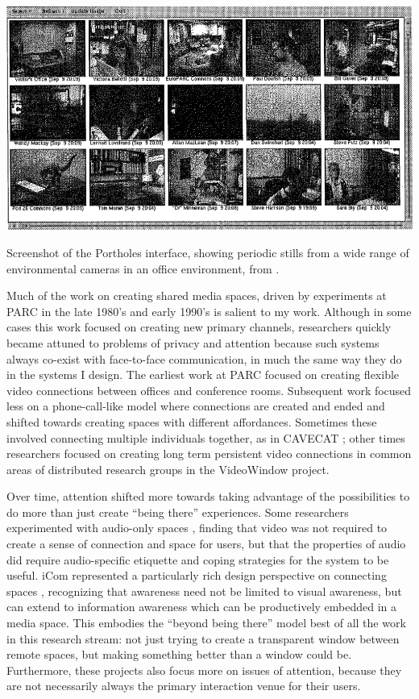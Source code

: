 \begin{marginfigure}
	\includegraphics{figures/portholes.png}
	\caption{Screenshot of the Portholes interface, showing periodic stills from a wide range of environmental cameras in an office environment, from \citep{Dourish:1992fu}.}
	\label{fig:portholes}
\end{marginfigure}


Much of the work on creating shared media spaces, driven by experiments at PARC in the late 1980's and early 1990's is salient to my work. Although in some cases this work focused on creating new primary channels, researchers quickly became attuned to problems of privacy and attention because such systems always co-exist with face-to-face communication, in much the same way they do in the systems I design. The earliest work at PARC \citep{Olson:1991vz} focused on creating flexible video connections between offices and conference rooms. Subsequent work focused less on a phone-call-like model where connections are created and ended and shifted towards creating spaces with different affordances. Sometimes these involved connecting multiple individuals together, as in CAVECAT \citep{Mantei:1991ww}; other times researchers focused on creating long term persistent video connections in common areas of distributed research groups in the VideoWindow \citep{Fish:1990fn} project. 


Over time, attention shifted more towards taking advantage of the possibilities to do more than just create ``being there'' experiences. Some researchers experimented with audio-only spaces \citep{hindus1996thunderwire}, finding that video was not required to create a sense of connection and space for users, but that the properties of audio did require audio-specific etiquette and coping strategies for the system to be useful. iCom represented a particularly rich design perspective on connecting spaces  \citep{Agamanolis:2003wc}, recognizing that awareness need not be limited to visual awareness, but can extend to information awareness which can be productively embedded in a media space. This embodies the ``beyond being there'' model best of all the work in this research stream: not just trying to create a transparent window between remote spaces, but making something better than a window could be. Furthermore, these projects also focus more on issues of attention, because they are not necessarily always the primary interaction venue for their users. 

